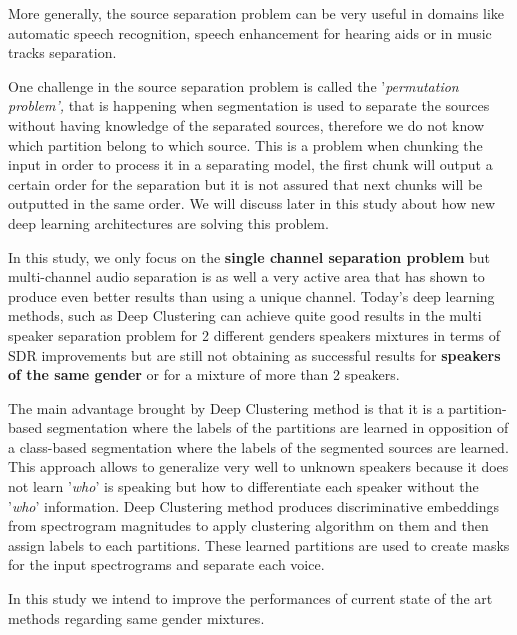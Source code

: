 \documentclass[master, tikz, final,11pt, dvipdfmx]{iscs-thesis}
\begin{document}
More generally, the source separation problem can be very useful in domains like automatic speech recognition, speech enhancement for hearing aids or in music tracks separation.

One challenge in the source separation problem is called the '\textit{permutation problem',} that is happening when segmentation is used to separate the sources without having knowledge of the separated sources, therefore we do not know which partition belong to which source. This is a problem when chunking the input in order to process it in a separating model, the first chunk will output a certain order for the separation but it is not assured that next chunks will be outputted in the same order. We will discuss later in this study about how new deep learning architectures are solving this problem.

In this study, we only focus on the \textbf{single channel separation problem} but multi-channel audio separation is as well a very active area that has shown to produce even better results than using a unique channel. Today's deep learning methods, such as Deep Clustering \cite{DPCLV1, DPCLV2} can achieve quite good results in the multi speaker separation problem for 2 different genders speakers mixtures in terms of SDR improvements but are still not obtaining as successful results for \textbf{speakers of the same gender} or for a mixture of more than 2 speakers. 

The main advantage brought by Deep Clustering \cite{DPCLV1} method is that it is a partition-based segmentation where the labels of the partitions are learned in opposition of a class-based segmentation where the labels of the segmented sources are learned. This approach allows to generalize very well to unknown speakers because it does not learn '\textit{who}' is speaking but how to differentiate each speaker without the '\textit{who}' information. Deep Clustering method produces discriminative embeddings from spectrogram magnitudes to apply clustering algorithm on them and then assign labels to each partitions. These learned partitions are used to create masks for the input spectrograms and separate each voice.

In this study we intend to improve the performances of current state of the art methods regarding same gender mixtures.
\end{document}

